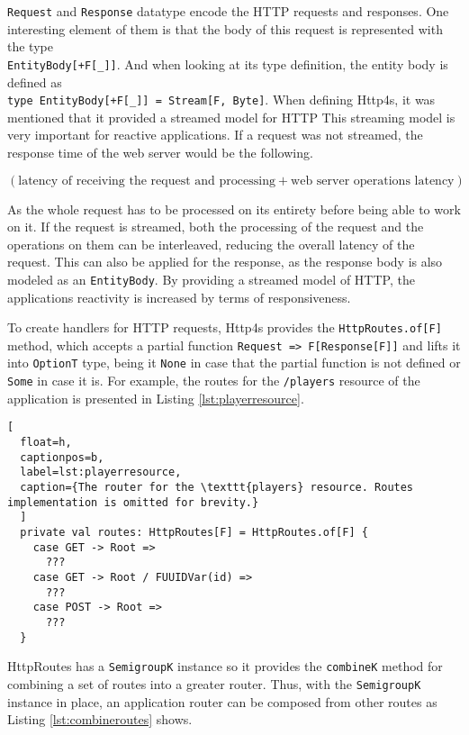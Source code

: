 \documentclass[../main.tex]{subfiles}
\begin{document}
\texttt{Request} and \texttt{Response} datatype encode the HTTP requests and
responses. One interesting element of them is that the body of this request is
represented with the type \\ \texttt{EntityBody[+F[\_]]}. And when looking at its
type definition, the entity body is defined as\\
\lstinline{type EntityBody[+F[_]] = Stream[F, Byte]}.
When defining Http4s, it was mentioned that it provided a streamed model for
HTTP This streaming model is very important for reactive applications. If a
request was not streamed, the response time of the web
server would be the following.

\begin{center}
$(\text{latency of receiving the request and processing} +
\text{web server operations latency})$
\end{center}

As the whole request has to be processed on its
entirety before being able to work on it. If the request is streamed, both
the processing of the request and the operations on them can be interleaved,
reducing the overall latency of the request. This can also be applied for the
response, as the response body is also modeled as an \texttt{EntityBody}. By
providing a streamed model of HTTP, the applications reactivity is increased by
terms of responsiveness.

To create handlers for HTTP requests, Http4s provides the \texttt{HttpRoutes.of[F]} method, which accepts a partial
function \texttt{Request => F[Response[F]]} and lifts it into \texttt{OptionT} type,
being it \texttt{None} in case that the partial function is not defined or \texttt{Some} in case
it is. For example, the routes for the \texttt{/players} resource of the
application is presented in Listing \ref{lst:playerresource}.

\begin{lstlisting}[
  float=h,
  captionpos=b,
  label=lst:playerresource,
  caption={The router for the \texttt{players} resource. Routes implementation is omitted for brevity.}
  ]
  private val routes: HttpRoutes[F] = HttpRoutes.of[F] {
    case GET -> Root =>
      ???
    case GET -> Root / FUUIDVar(id) =>
      ???
    case POST -> Root =>
      ???
  }
\end{lstlisting}

HttpRoutes has a \texttt{SemigroupK} instance so it provides the \texttt{combineK} method
for combining a set of routes into a greater router. Thus, with the \texttt{SemigroupK}
instance in place, an application router can be composed from other routes as Listing
\ref{lst:combineroutes} shows.
\end{document}
